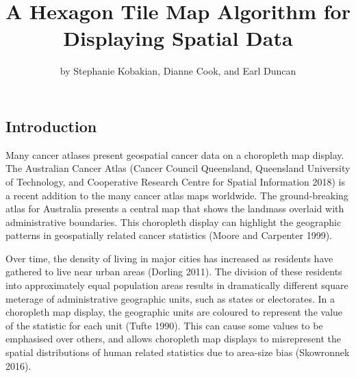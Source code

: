 \title{A Hexagon Tile Map Algorithm for Displaying Spatial Data}
\author{by Stephanie Kobakian, Dianne Cook, and Earl Duncan}

\maketitle


\hypertarget{introduction}{%
\subsection{Introduction}\label{introduction}}

Many cancer atlases present geospatial cancer data on a choropleth map display. The Australian Cancer Atlas (Cancer Council Queensland, Queensland University of Technology, and Cooperative Research Centre for Spatial Information 2018) is a recent addition to the many cancer atlas maps worldwide. The ground-breaking atlas for Australia presents a central map that shows the landmass overlaid with administrative boundaries. This choropleth display can highlight the geographic patterns in geospatially related cancer statistics (Moore and Carpenter 1999).

Over time, the density of living in major cities has increased as residents have gathered to live near urban areas (Dorling 2011). The division of these residents into approximately equal population areas results in dramatically different square meterage of administrative geographic units, such as states or electorates. In a choropleth map display, the geographic units are coloured to represent the value of the statistic for each unit (Tufte 1990). This can cause some values to be emphasised over others, and allows choropleth map displays to misrepresent the spatial distributions of human related statistics due to area-size bias (Skowronnek 2016).

